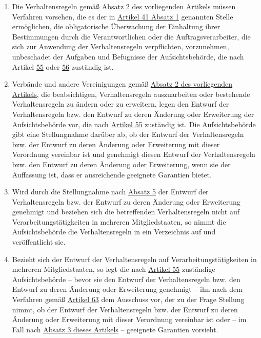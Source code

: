 \begin{enumerate}
  \item Die Verhaltensregeln gemäß \hyperref[itm:40-2]{Absatz 2 des vorliegenden Artikels} müssen Verfahren vorsehen,
   die es der in \hyperref[itm:41-2]{Artikel 41 Absatz 1} genannten Stelle ermöglichen, die obligatorische Überwachung
   der Einhaltung ihrer Bestimmungen durch die Verantwortlichen oder die Auftragsverarbeiter, die sich zur Anwendung
   der Verhaltensregeln verpflichten, vorzunehmen, unbeschadet der Aufgaben und Befugnisse der Aufsichtsbehörde, die
   nach Artikel \hyperref[ch:55]{55} oder \hyperref[ch:56]{56} zuständig ist.
  \label{itm:40-4}

  \item Verbände und andere Vereinigungen gemäß \hyperref[itm:40-2]{Absatz 2 des vorliegenden Artikels}, die
   beabsichtigen, Verhaltensregeln auszuarbeiten oder bestehende Verhaltensregeln zu ändern oder zu erweitern, legen
   den Entwurf der Verhaltensregeln bzw. den Entwurf zu deren Änderung oder Erweiterung der Aufsichtsbehörde vor, die
   nach \hyperref[ch:55]{Artikel 55} zuständig ist. Die Aufsichtsbehörde gibt eine Stellungnahme darüber ab, ob der
   Entwurf der Verhaltensregeln bzw. der Entwurf zu deren Änderung oder Erweiterung mit dieser Verordnung vereinbar ist
   und genehmigt diesen Entwurf der Verhaltensregeln bzw. den Entwurf zu deren Änderung oder Erweiterung, wenn sie der
   Auffassung ist, dass er ausreichende geeignete Garantien bietet.
  \label{itm:40-5}

  \item Wird durch die Stellungnahme nach \hyperref[itm:40-5]{Absatz 5} der Entwurf der Verhaltensregeln bzw. der
   Entwurf zu deren Änderung oder Erweiterung genehmigt und beziehen sich die betreffenden Verhaltensregeln nicht auf
   Verarbeitungstätigkeiten in mehreren Mitgliedstaaten, so nimmt die Aufsichtsbehörde die Verhaltensregeln in ein
   Verzeichnis auf und veröffentlicht sie.
  \label{itm:40-6}

  \item Bezieht sich der Entwurf der Verhaltensregeln auf Verarbeitungstätigkeiten in mehreren Mitgliedstaaten, so legt
   die nach \hyperref[ch:55]{Artikel 55} zuständige Aufsichtsbehörde -- bevor sie den Entwurf der Verhaltensregeln bzw.
   den Entwurf zu deren Änderung oder Erweiterung genehmigt -- ihn nach dem Verfahren gemäß \hyperref[ch:63]
   {Artikel 63} dem Ausschuss vor, der zu der Frage Stellung nimmt, ob der Entwurf der Verhaltensregeln bzw. der
   Entwurf zu deren Änderung oder Erweiterung mit dieser Verordnung vereinbar ist oder -- im Fall nach \hyperref
   [itm:40-3]{Absatz 3 dieses Artikels} -- geeignete Garantien vorsieht.
  \label{itm:40-7}


\end{enumerate}
